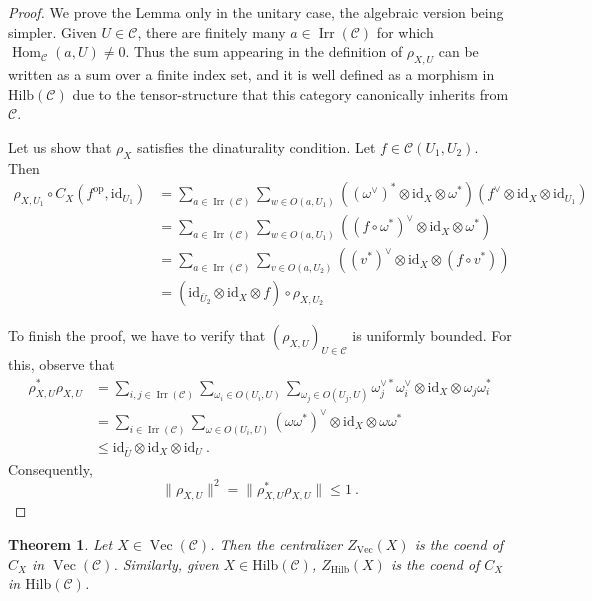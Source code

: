 \documentclass[a4paper,11pt,reqno]{amsart}
\numberwithin{equation}{section}
\newtheorem{theorem}{Theorem}[section]
\theoremstyle{remark}
\theoremstyle{definition}
\newcommand{\cC}{\mathcal C}
\DeclareMathOperator{\Hom}{Hom}
\DeclareMathOperator{\Irr}{Irr}
\DeclareMathOperator{\Vect}{Vec}
\newcommand\op{\text{op}}
\newcommand{\id}{\mathrm{id}}
\newcommand{\Hilb}{\mathrm{Hilb}}
\begin{document}
\begin{proof}
	We prove the Lemma only in the unitary case, the algebraic version being simpler.  Given $U \in \cC$, there are finitely many $a \in \Irr(\cC)$ for which $\Hom_\cC(a,U) \neq 0$. Thus the sum appearing in the definition of $\rho_{X,U}$ can be written as a sum over a finite index set, and it is well defined as a morphism in $\Hilb(\cC)$ due to the tensor-structure that this category canonically inherits from $\cC$. 
	
	Let us show that $\rho_X$ satisfies the dinaturality condition. Let $f \in \cC(U_1,U_2)$. Then
	\begin{align*}
		\rho_{X,U_1} \circ C_X(f^{\op},\id_{U_1}) & = \sum_{a \in \Irr(\cC)} \sum_{w \in O(a,U_1)} ((\omega^\vee)^* \otimes \id_X \otimes \omega^*) (f^\vee \otimes \id_X \otimes \id_{U_1}) \\
		& = \sum_{a \in \Irr(\cC)} \sum_{w \in O(a,U_1)} ((f\circ \omega^*)^\vee \otimes \id_X \otimes \omega^*) 
		\\
		& = \sum_{a \in \Irr(\cC)} \sum_{v \in O(a,U_2)} (( v^*)^\vee \otimes \id_X \otimes (f \circ v^*))  \\
		& = (\id_{\bar{U}_2} \otimes \id_X \otimes f) \circ \rho_{X,U_2}
	\end{align*}
	
	To finish the proof, we have to verify that $(\rho_{X,U})_{U \in \cC}$ is uniformly bounded. For this, observe that 
	\begin{align*}
		\rho_{X,U}^* \rho_{X,U} & = \sum_{i,j \in \Irr(\cC)} \sum_{\omega_i \in O(U_i,U)} \sum_{\omega_j \in O(U_j,U)} \omega_j^{\vee *} \omega_i^\vee \otimes \id_X \otimes \omega_j \omega_i^*\\
		&= \sum_{i \in \Irr(\cC)} \sum_{\omega \in O(U_i,U)} (\omega \omega^*)^\vee \otimes \id_X \otimes \omega \omega^* \\
		& \leq \id_{\bar{U}} \otimes \id_X \otimes \id_U \ . 
	\end{align*}
	Consequently,
	$$\| \rho_{X,U}\|^2 = \|\rho_{X,U}^* \rho_{X,U} \| \leq 1 \ . $$
\end{proof}

\begin{theorem}
	Let $X \in \Vect(\cC)$. Then the centralizer $Z_{\Vect}(X)$ is the coend of $C_X$ in $\Vect(\cC)$. Similarly, given $X \in \Hilb(\cC)$, $Z_{\Hilb}(X)$ is the coend of $C_X$ in $\Hilb(\cC)$.
	\label{thm:definitionmonadZ}
\end{theorem}
\end{document}
